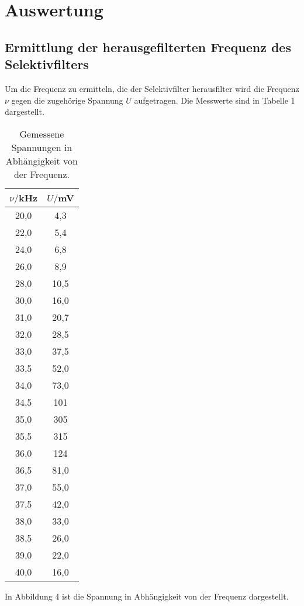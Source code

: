 \section{Auswertung}
\label{sec:Auswertung}
\subsection{Ermittlung der herausgefilterten Frequenz des Selektivfilters}
Um die Frequenz zu ermitteln, die der Selektivfilter herausfilter wird die Frequenz $\nu$ gegen
die zugehörige Spannung $U$ aufgetragen. Die Messwerte sind in Tabelle 1 dargestellt.

\begin{table}[H]
  \centering
  \caption{Gemessene Spannungen in Abhängigkeit von der Frequenz.}
  \label{tab:Rechteckspannung}
  \begin{tabular}{c c}
    \toprule
    $\nu/$kHz & $U/$mV \\
    \midrule
    20,0 &       4,3 \\
    22,0 &       5,4 \\
    24,0 &       6,8 \\
    26,0 &       8,9 \\
    28,0 &      10,5 \\
    30,0 &      16,0 \\
    31,0 &      20,7 \\
    32,0 &      28,5 \\
    33,0 &      37,5 \\
    33,5 &      52,0 \\
    34,0 &      73,0 \\
    34,5 &       101 \\
    35,0 &       305 \\
    35,5 &       315 \\
    36,0 &       124 \\
    36,5 &      81,0 \\
    37,0 &      55,0 \\
    37,5 &      42,0 \\
    38,0 &      33,0 \\
    38,5 &      26,0 \\
    39,0 &      22,0 \\
    40,0 &      16,0 \\
    \bottomrule
  \end{tabular}
\end{table}

In Abbildung 4 ist die Spannung in Abhängigkeit von der Frequenz dargestellt.

